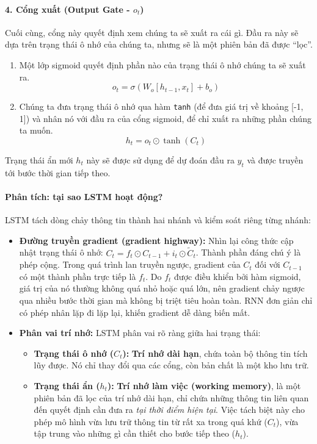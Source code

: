\paragraph{4. Cổng xuất (Output Gate - $o_t$)}
Cuối cùng, cổng này quyết định xem chúng ta sẽ xuất ra cái gì. Đầu ra này sẽ dựa trên trạng thái ô nhớ của chúng ta, nhưng sẽ là một phiên bản đã được “lọc”.
\begin{enumerate}
    \item Một lớp sigmoid quyết định phần nào của trạng thái ô nhớ chúng ta sẽ xuất ra.
        $$ o_t = \sigma(W_o [h_{t-1}, x_t] + b_o) $$
    \item Chúng ta đưa trạng thái ô nhớ qua hàm \texttt{tanh} (để đưa giá trị về khoảng [-1, 1]) và nhân nó với đầu ra của cổng sigmoid, để chỉ xuất ra những phần chúng ta muốn.
        $$ h_t = o_t \odot \tanh(C_t) $$
\end{enumerate}
Trạng thái ẩn mới $h_t$ này sẽ được sử dụng để dự đoán đầu ra $y_t$ và được truyền tới bước thời gian tiếp theo.
\paragraph{Phân tích: tại sao LSTM hoạt động?}
LSTM tách dòng chảy thông tin thành hai nhánh và kiểm soát riêng từng nhánh:
\begin{itemize}
    \item \textbf{Đường truyền gradient (gradient highway):} Nhìn lại công thức cập nhật trạng thái ô nhớ: $C_t = f_t \odot C_{t-1} + i_t \odot \tilde{C}_t$. Thành phần đáng chú ý là phép cộng. Trong quá trình lan truyền ngược, gradient của $C_t$ đối với $C_{t-1}$ có một thành phần trực tiếp là $f_t$. Do $f_t$ được điều khiển bởi hàm sigmoid, giá trị của nó thường không quá nhỏ hoặc quá lớn, nên gradient chảy ngược qua nhiều bước thời gian mà không bị triệt tiêu hoàn toàn. RNN đơn giản chỉ có phép nhân lặp đi lặp lại, khiến gradient dễ dàng biến mất.

    \item \textbf{Phân vai trí nhớ:} LSTM phân vai rõ ràng giữa hai trạng thái:
        \begin{itemize}
            \item \textbf{Trạng thái ô nhớ ($C_t$):} \textbf{Trí nhớ dài hạn}, chứa toàn bộ thông tin tích lũy được. Nó chỉ thay đổi qua các cổng, còn bản chất là một kho lưu trữ.
            \item \textbf{Trạng thái ẩn ($h_t$):} \textbf{Trí nhớ làm việc (working memory)}, là một phiên bản đã lọc của trí nhớ dài hạn, chỉ chứa những thông tin liên quan đến quyết định cần đưa ra \textit{tại thời điểm hiện tại}. Việc tách biệt này cho phép mô hình vừa lưu trữ thông tin từ rất xa trong quá khứ ($C_t$), vừa tập trung vào những gì cần thiết cho bước tiếp theo ($h_t$).
        \end{itemize}
\end{itemize}
